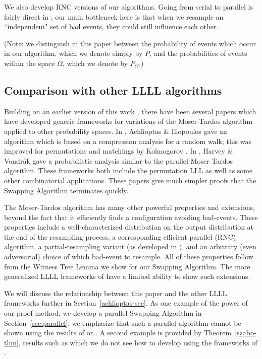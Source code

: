  We also develop RNC versions of our algorithms. Going from serial to parallel is fairly direct in \cite{moser-tardos}; our main bottleneck here is that when we resample an ``independent" set of bad events, they could still influence each other. 

(Note: we distinguish in this paper between the probability of events which occur in our algorithm, which we denote simply by $P$, and the probabilities of events within the space $\Omega$, which we denote by $P_{\Omega}$.)

\subsection{Comparison with other LLLL algorithms}
\label{sec:intro-comparison}
Building on an earlier version of this work \cite{harris-srin-lllperm}, there have been several papers which have developed generic frameworks for variations of the Moser-Tardos algorithm applied to other probability spaces. In \cite{achlioptas},  Achlioptas \& Iliopoulos gave an algorithm which is based on a compression analysis for a random walk; this was improved for permutations and matchings by Kolmogorov \cite{kolmogorov}. In \cite{harvey}, Harvey \& Vondr\'{a}k gave a probabilistic analysis similar to the parallel Moser-Tardos algorithm. These frameworks both include the permutation LLL as well as some other combinatorial applications. These papers give much simpler proofs that the Swapping Algorithm terminates quickly. 

The Moser-Tardos algorithm has many other powerful properties and extensions, beyond the fact that it efficiently finds a configuration avoiding bad-events. These properties include a well-characterized distribution on the output distribution at the end of the resampling process, a corresponding efficient parallel (RNC) algorithm, a partial-resampling variant (as developed in \cite{harris-srin2}), and an arbitrary (even adversarial) choice of which bad-event to resample. All of these properties follow from the Witness Tree Lemma we show for our Swapping Algorithm. The more generalized LLLL frameworks of \cite{achlioptas,harvey} have a limited ability to show such extensions. 

We will discuss the relationship between this paper and the other LLLL frameworks further in Section~\ref{achlioptas-sec}. As one example of the power of our proof method, we develop a parallel Swapping Algorithm in Section~\ref{sec:parallel}; we emphasize that such a parallel algorithm cannot be shown using the results of \cite{achlioptas} or \cite{harvey}. A second example is provided by Theorem~\ref{szabo-thm}, results such as which we do not see how to develop using the frameworks of \cite{achlioptas,harvey,kolmogorov}. 

